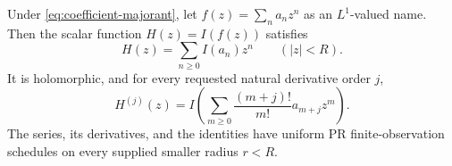 \begin{theorem}\label{thm:holomorphic-integral}
Under \eqref{eq:coefficient-majorant}, let $f(z)=\sum_na_nz^n$ as an
$L^1$-valued name. Then the scalar function $H(z)=I(f(z))$ satisfies
\begin{equation}\label{eq:integral-series}
 H(z)=\sum_{n\ge0}I(a_n)z^n\qquad(|z|<R).
\end{equation}
It is holomorphic, and for every requested natural derivative order $j$,
\begin{equation}\label{eq:integral-derivative}
 H^{(j)}(z)=I\left(\sum_{m\ge0}\frac{(m+j)!}{m!}
                    a_{m+j}z^m\right).
\end{equation}
The series, its derivatives, and the identities have uniform PR
finite-observation schedules on every supplied smaller radius $r<R$.
\end{theorem}
